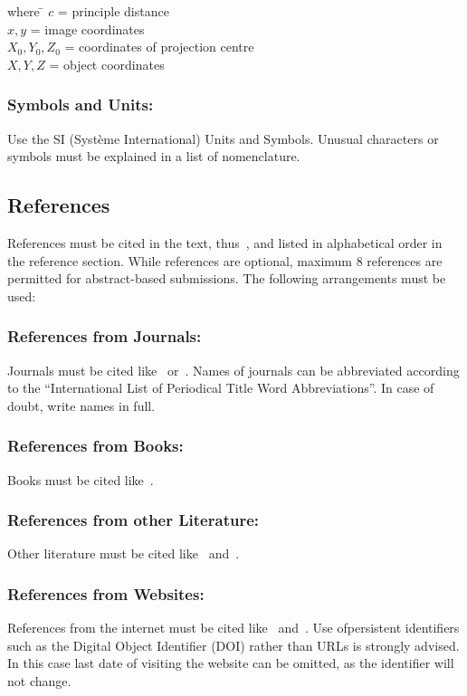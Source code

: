\documentclass{isprs} %
\begin{document}
\begin{tabbing}
where \hspace{0.6cm} \= $c$ = principle distance\\
\> $x,y$ = image coordinates\\
\> $X_0,Y_0, Z_0$ = coordinates of projection centre\\
\> $X, Y, Z$ = object coordinates
\end{tabbing}

\subsubsection{Symbols and Units:}\label{sec:Symbols and Units}
Use the SI (Syst\`{e}me International) Units and Symbols. Unusual characters
or symbols must be explained in a list of nomenclature.

\subsection{References}\label{sec:References}
References must be cited in the text, thus~\cite{smith1987rep}, and listed in alphabetical order in the reference section. While references are optional, maximum 8 references are permitted for abstract-based submissions. The following arrangements must be used:

\subsubsection{References from Journals:}
Journals must be cited like~\cite{smith1987} or~\cite{michalis2008}. Names of journals can be abbreviated according to the ``International List of Periodical Title Word Abbreviations''. In case of doubt, write names in full.

\subsubsection{References from Books:}
Books must be cited like~\cite{foerstner2016}.

\subsubsection{References from other Literature:}
Other literature must be cited like~\cite{smith1987rep} and~\cite{smith2000}.

\subsubsection{References from Websites:}
References from the internet must be cited like~\cite{chan2017} and~\cite{maas2017}. Use ofpersistent identifiers such as the Digital Object Identifier (DOI) rather than URLs is strongly advised. In this case last date of visiting the website can be omitted, as the identifier will not change.
\end{document}
